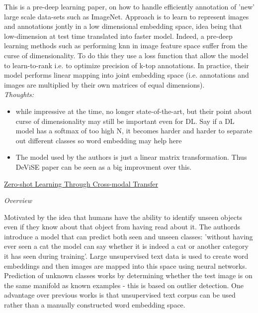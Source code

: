 \documentclass{report}
\begin{document}
This is a pre-deep learning paper, on how to handle efficiently annotation of 'new' large scale data-sets such as ImageNet.  Approach is to learn to represent images and annotations jontly in a low dimensional embedding space, idea being that low-dimension at test time translated into faster model. Indeed, a pre-deep learning methods such as performing knn in image feature space suffer from the curse of dimensionality.  To do this they use a loss function that allow the model to learn-to-rank i.e. to optimize precision of k-top annotations. In practice, their model performs linear mapping into joint embedding space (i.e. annotations and images are multiplied by their own matrices of equal dimensions). \\
\textit{Thoughts:}
\begin{itemize}
    \item while impressive at the time, no longer state-of-the-art, but their point about curse of dimensionality may still be important even for DL. Say if a DL model has a softmax of too high N, it becomes harder and harder to separate out different classes so word embedding may help here
    \item The model used by the authors is just a linear matrix transformation. Thus DeViSE paper can be seen as a big improvment over this. \\
  \end{itemize}

\underline{Zero-shot Learning Through Cross-modal Transfer \cite{Socher}}

\textit{Overview}

Motivated by the idea that humans have the ability to identify unseen objects even if they know about that object from having read about it. The authords introduce a model that can predict both seen and unseen classes: 'without having ever seen a cat the model can say whether it is indeed a cat or another category it has seen during training'. Large unsupervised text data is used to create word embeddings and then images are mapped into this space using neural networks. Prediction of unknown classes works by determining whether the test image is on the same manifold as known examples - this is based on outlier detection. One advantage over previous works is that unsupervised text corpus can be used rather than a manually constructed word embedding space.
\end{document}
